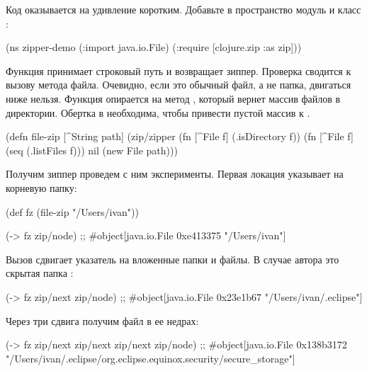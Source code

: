 Код оказывается на удивление коротким. Добавьте в пространство модуль
 и класс :

\begin{english}
  \begin{clojure}
(ns zipper-demo
  (:import java.io.File)
  (:require
   [clojure.zip :as zip]))
  \end{clojure}
\end{english}

Функция  принимает строковый путь и возвращает зиппер. Проверка
 сводится к вызову метода  файла. Очевидно, если это
обычный файл, а не папка, двигаться ниже нельзя. Функция  опирается на
метод , который вернет массив файлов в директории. Обертка в 
необходима, чтобы привести пустой массив к .

\begin{english}
  \begin{clojure}
(defn file-zip [^String path]
  (zip/zipper
   (fn [^File f] (.isDirectory f))
   (fn [^File f] (seq (.listFiles f)))
   nil
   (new File path)))
  \end{clojure}
\end{english}

Получим зиппер проведем с ним эксперименты. Первая локация указывает на
корневую папку:

\begin{english}
  \begin{clojure}
(def fz
  (file-zip "/Users/ivan"))

(-> fz zip/node)
;; #object[java.io.File 0xe413375 "/Users/ivan"]
  \end{clojure}
\end{english}

Вызов  сдвигает указатель на вложенные папки и файлы. В случае автора
это скрытая папка :

\begin{english}
  \begin{clojure}
(-> fz zip/next zip/node)
;; #object[java.io.File 0x23e1b67 "/Users/ivan/.eclipse"]
  \end{clojure}
\end{english}

Через три сдвига получим файл  в ее недрах:

\begin{english}
  \begin{clojure}
(-> fz zip/next zip/next zip/next zip/node)
;; #object[java.io.File 0x138b3172 "/Users/ivan/.eclipse/org.eclipse.equinox.security/secure_storage"]
  \end{clojure}
\end{english}

